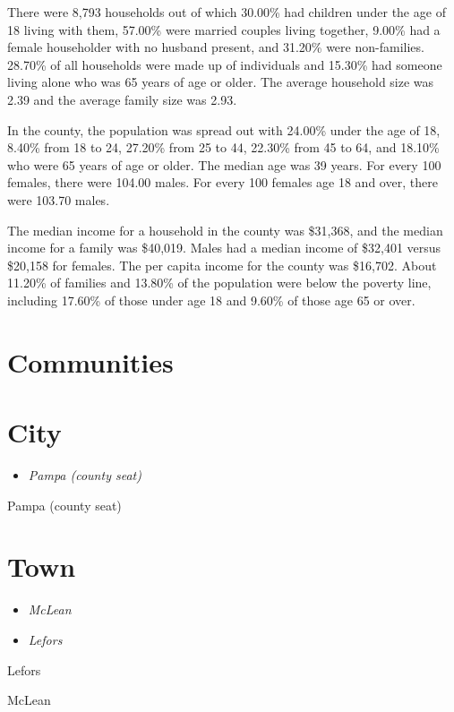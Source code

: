 There were 8,793 households out of which 30.00\% had children under the
age of 18 living with them, 57.00\% were married couples living
together, 9.00\% had a female householder with no husband present, and
31.20\% were non-families. 28.70\% of all households were made up of
individuals and 15.30\% had someone living alone who was 65 years of age
or older. The average household size was 2.39 and the average family
size was 2.93.

In the county, the population was spread out with 24.00\% under the age
of 18, 8.40\% from 18 to 24, 27.20\% from 25 to 44, 22.30\% from 45 to
64, and 18.10\% who were 65 years of age or older. The median age was 39
years. For every 100 females, there were 104.00 males. For every 100
females age 18 and over, there were 103.70 males.

The median income for a household in the county was \$31,368, and the
median income for a family was \$40,019. Males had a median income of
\$32,401 versus \$20,158 for females. The per capita income for the
county was \$16,702. About 11.20\% of families and 13.80\% of the
population were below the poverty line, including 17.60\% of those under
age 18 and 9.60\% of those age 65 or over.

\section{Communities}\label{communities}

\section{City}\label{city}

\begin{itemize}
\item
  \emph{Pampa (county seat)}
\end{itemize}

Pampa (county seat)

\section{Town}\label{town}

\begin{itemize}
\item
  \emph{McLean}
\item
  \emph{Lefors}
\end{itemize}

Lefors

McLean

